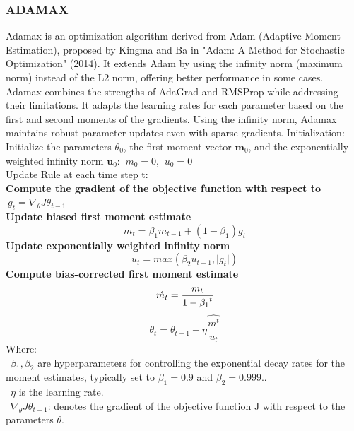 \documentclass{ieeeojies}
\begin{document}
\subsubsection{ADAMAX}
Adamax is an optimization algorithm derived from Adam (Adaptive Moment Estimation), proposed by Kingma and Ba in "Adam: A Method for Stochastic Optimization" (2014). It extends Adam by using the infinity norm (maximum norm) instead of the L2 norm, offering better performance in some cases\cite{Adamax_1}.\\
Adamax combines the strengths of AdaGrad and RMSProp while addressing their limitations. It adapts the learning rates for each parameter based on the first and second moments of the gradients. Using the infinity norm, Adamax maintains robust parameter updates even with sparse gradients.
Initialization: Initialize the parameters $\theta_0$, the first moment vector $\mathbf{m}_0$, and the exponentially weighted infinity norm $\mathbf{u}_0$: $\ m_0 = 0$, $\ u_0 = 0$\\
Update Rule at each time step t:\\
\textbf{Compute the gradient of the objective function with respect to} $\ g_{t} = \nabla_{\theta} J \theta_{t-1}$\\
\textbf{Update biased first moment estimate}
\[\ m_{t} = \beta_{1} m_{t-1}  + (1-\beta_1) g_t\] 
\textbf{Update exponentially weighted infinity norm}
\[\ u_t = max(\beta_{2} u_{t-1}, \vert{g_t}\vert) \]
\textbf{Compute bias-corrected first moment estimate}
\[\ \hat{m_t} = \frac{m_t}{1 - {\beta_1}\sp{t}}\] 
\[\ \theta_{t} = \theta_{t-1} - \eta\frac{\hat {m^t}}{u_t}\] 
Where: \\
        \indent\textbullet\ $\beta_1, \beta_2$ are hyperparameters for controlling the exponential decay rates for the moment estimates, typically set to $\beta_1 = 0.9 $ and $\beta_2 = 0.999..$\\
        \indent\textbullet\ $\eta$ is the learning rate.\\
        \indent\textbullet\ $\nabla_{\theta} J \theta_{t-1}$: denotes the gradient of the objective function J with respect to the parameters $\theta$.
        
\end{document}
